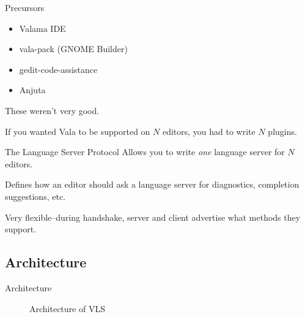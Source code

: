 \documentclass[t]{beamer}
\begin{document}

\begin{frame}[c]{Precursors}
    \begin{itemize}
        \item Valama IDE
        \item vala-pack (GNOME Builder)
        \item gedit-code-assistance
        \item Anjuta
    \end{itemize}
    
    These weren't very good.
    
    If you wanted Vala to be supported on $N$ editors, you had to write $N$ plugins.
\end{frame}

\begin{frame}[c]{The Language Server Protocol}
    Allows you to write \textit{one} language server for $N$ editors.
    
    Defines how an editor should ask a language server for diagnostics, completion suggestions, etc.
    
    Very flexible--during handshake, server and client advertise what methods they support.
\end{frame}

\subsection{Architecture}
\begin{frame}[c]{Architecture}
    \begin{figure}
        \begin{center}
            \def\svgwidth{\columnwidth}
            
            \caption{Architecture of VLS}
        \end{center}
    \end{figure}
\end{frame}
\end{document}
